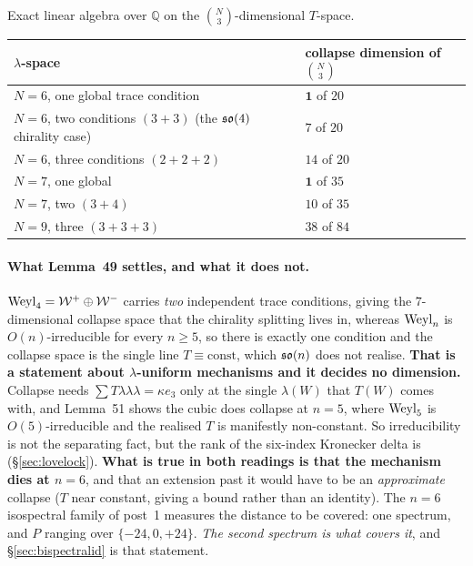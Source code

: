 \begin{certificate}
Exact linear algebra over $\mathbb Q$ on the $\binom N3$-dimensional $T$-space.
\begin{center}
\begin{tabular}{@{}ll@{}}
\toprule
$\lambda$-space & collapse dimension of $\binom N3$ \\
\midrule
$N=6$, one global trace condition & $\mathbf1$ of $20$ \\
$N=6$, two conditions $(3+3)$ (the $\mathfrak{so}(4)$ chirality case) & $7$ of $20$ \\
$N=6$, three conditions $(2+2+2)$ & $14$ of $20$ \\
$N=7$, one global & $\mathbf1$ of $35$ \\
$N=7$, two $(3+4)$ & $10$ of $35$ \\
$N=9$, three $(3+3+3)$ & $38$ of $84$ \\
\bottomrule
\end{tabular}
\end{center}
\end{certificate}

\paragraph{What Lemma~49 settles, and what it does not.} $\mathrm{Weyl}_4=\mathcal W^{+}\oplus\mathcal W^{-}$ carries \emph{two} independent trace conditions, giving the $7$-dimensional collapse space that the chirality splitting lives in, whereas $\mathrm{Weyl}_n$ is $O(n)$-irreducible for every $n\ge5$, so there is exactly one condition and the collapse space is the single line $T\equiv\text{const}$, which $\mathfrak{so}(n)$ does not realise. \textbf{That is a statement about $\lambda$-uniform mechanisms and it decides no dimension.} Collapse needs $\sum T\lambda\lambda\lambda=\kappa e_3$ only at the single $\lambda(W)$ that $T(W)$ comes with, and Lemma~51 shows the cubic does collapse at $n=5$, where $\mathrm{Weyl}_5$ is $O(5)$-irreducible and the realised $T$ is manifestly non-constant. So irreducibility is not the separating fact, but the rank of the six-index Kronecker delta is (\S\ref{sec:lovelock}). \textbf{What is true in both readings is that the mechanism dies at $n=6$}, and that an extension past it would have to be an \emph{approximate} collapse ($T$ near constant, giving a bound rather than an identity). The $n=6$ isospectral family of post~1 measures the distance to be covered: one spectrum, and $P$ ranging over $\{-24,0,+24\}$. \emph{The second spectrum is what covers it}, and \S\ref{sec:bispectralid} is that statement.

